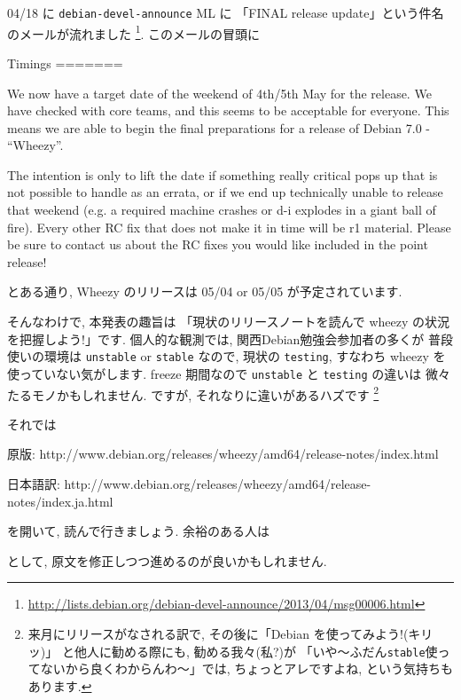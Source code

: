 \documentclass[mingoth,a4paper]{jsarticle}
\begin{document}
04/18 に \texttt{debian-devel-announce} ML に
「FINAL release update」という件名のメールが流れました
\footnote{\url{http://lists.debian.org/debian-devel-announce/2013/04/msg00006.html}}.
このメールの冒頭に
\begin{commandline}
Timings
=======

We now have a target date of the weekend of 4th/5th May for the release.
We have checked with core teams, and this seems to be acceptable for
everyone. This means we are able to begin the final preparations for a
release of Debian 7.0 - ``Wheezy''.

The intention is only to lift the date if something really critical pops
up that is not possible to handle as an errata, or if we end up
technically unable to release that weekend (e.g. a required machine
crashes or d-i explodes in a giant ball of fire). Every other RC fix
that does not make it in time will be r1 material. Please be sure to
contact us about the RC fixes you would like included in the point
release!
\end{commandline}
\noindent
とある通り, Wheezy のリリースは 05/04 or 05/05 が予定されています.

そんなわけで, 本発表の趣旨は
「現状のリリースノートを読んで wheezy の状況を把握しよう!」です.
%
個人的な観測では, 関西Debian勉強会参加者の多くが
普段使いの環境は \texttt{unstable} or \texttt{stable} なので,
現状の \texttt{testing}, すなわち wheezy を使っていない気がします.
%
freeze 期間なので \texttt{unstable} と \texttt{testing} の違いは
微々たるモノかもしれません.
%
ですが, それなりに違いがあるハズです
\footnote{%
  来月にリリースがなされる訳で, その後に「Debian を使ってみよう!(キリッ)」
  と他人に勧める際にも, 勧める我々(私?)が
  「いや〜ふだん\texttt{stable}使ってないから良くわからんわ〜」では,
  ちょっとアレですよね, という気持ちもあります.
}

それでは
\begin{commandline}
  原版:
  http://www.debian.org/releases/wheezy/amd64/release-notes/index.html

  日本語訳:
  http://www.debian.org/releases/wheezy/amd64/release-notes/index.ja.html
\end{commandline}
\noindent
を開いて, 読んで行きましょう.
余裕のある人は
\noindent
として, 原文を修正しつつ進めるのが良いかもしれません.

\clearpage
{}
\end{document}
